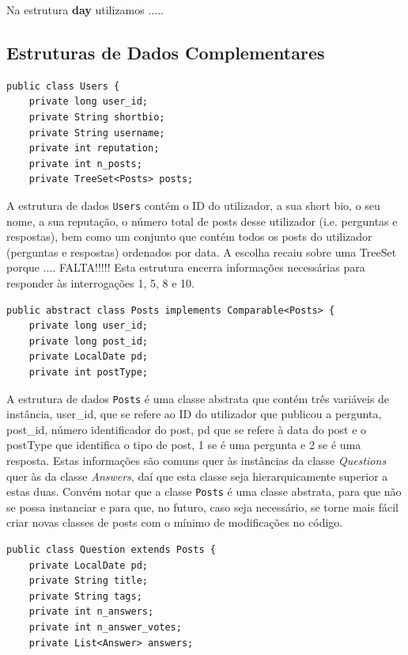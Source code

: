 \documentclass[a4paper]{article}
\begin{document}
Na estrutura \textbf{day} utilizamos .....


\subsection{Estruturas de Dados Complementares}
\label{sec:dados_complementares}

\begin{verbatim}
public class Users {
    private long user_id;
    private String shortbio;
    private String username;
    private int reputation;
    private int n_posts;
    private TreeSet<Posts> posts;
\end{verbatim}

A estrutura de dados \texttt{Users} contém o ID do utilizador, a sua short bio, o seu nome,
a sua reputação, o número total de posts desse utilizador (i.e. perguntas e respostas),
bem como um conjunto que contém todos os posts do utilizador (perguntas e respostas)
ordenados por data. A escolha recaiu sobre uma TreeSet porque .... FALTA!!!!!
Esta estrutura encerra informações necessárias para responder às interrogações 1,
5, 8 e 10.

\begin{verbatim}
public abstract class Posts implements Comparable<Posts> {
    private long user_id;
    private long post_id;
    private LocalDate pd;
    private int postType;
\end{verbatim}

A estrutura de dados \texttt{Posts} é uma classe abstrata que contém três variáveis
de instância, user\_id, que se refere ao ID do utilizador que publicou a pergunta,
post\_id, número identificador do post, pd que se refere à data do post e o
postType que identifica o tipo de post, 1 se é uma pergunta e 2 se é uma resposta.
Estas informações são comuns quer às instâncias da classe
\textit{Questions} quer às da classe \textit{Answers}, daí que esta classe seja
hierarquicamente superior a estas duas. Convém notar que a classe \texttt{Posts} é uma
classe abstrata, para que não se possa instanciar e para que, no futuro,
caso seja necessário, se torne mais fácil criar novas classes de posts com o
mínimo de modificações no código.


\begin{verbatim}
public class Question extends Posts {
    private LocalDate pd;
    private String title;
    private String tags;
    private int n_answers;
    private int n_answer_votes;
    private List<Answer> answers;
\end{verbatim}
\end{document}
